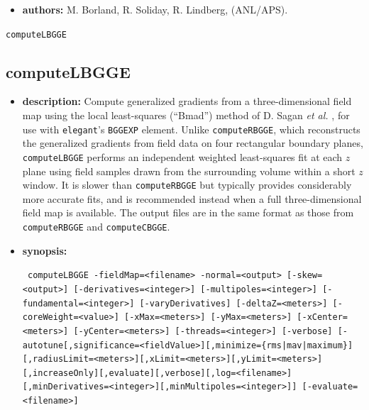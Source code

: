 \documentclass[11pt]{article}
\begin{document}
\begin{itemize}
\item {\bf authors:} M. Borland, R. Soliday, R. Lindberg, (ANL/APS).
\end{itemize}

\newpage
\begin{center}{\Large\verb|computeLBGGE|}\end{center}
\subsection{computeLBGGE\label{computeLBGGE}}

\begin{itemize}
\item {\bf description:} Compute generalized gradients \cite{Venturini-NIMA427-387} from a three-dimensional field map
  using the local least-squares (``Bmad'') method of D. Sagan {\em et al.} \cite{sagan:ipac23-wepl015}, for use with
  {\tt elegant}'s \verb|BGGEXP| element. Unlike \verb|computeRBGGE|, which reconstructs the generalized gradients from
  field data on four rectangular boundary planes, \verb|computeLBGGE| performs an independent weighted least-squares fit
  at each $z$ plane using field samples drawn from the surrounding volume within a short $z$ window. It is slower than
  \verb|computeRBGGE| but typically provides considerably more accurate fits, and is recommended instead when a full
  three-dimensional field map is available. The output files are in the same format as those from \verb|computeRBGGE|
  and \verb|computeCBGGE|.

\item {\bf synopsis:}
\begin{flushleft}{\tt
computeLBGGE -fieldMap=<filename> -normal=<output> [-skew=<output>]
   [-derivatives=<integer>] [-multipoles=<integer>] [-fundamental=<integer>]
   [-varyDerivatives] [-deltaZ=<meters>] [-coreWeight=<value>]
   [-xMax=<meters>] [-yMax=<meters>] [-xCenter=<meters>] [-yCenter=<meters>]
   [-threads=<integer>] [-verbose]
   [-autotune[,significance=<fieldValue>][,minimize=\{rms|mav|maximum\}]
             [,radiusLimit=<meters>][,xLimit=<meters>][,yLimit=<meters>]
             [,increaseOnly][,evaluate][,verbose][,log=<filename>]
             [,minDerivatives=<integer>][,minMultipoles=<integer>]]
   [-evaluate=<filename>]
}\end{flushleft}


\end{itemize}
\end{document}
